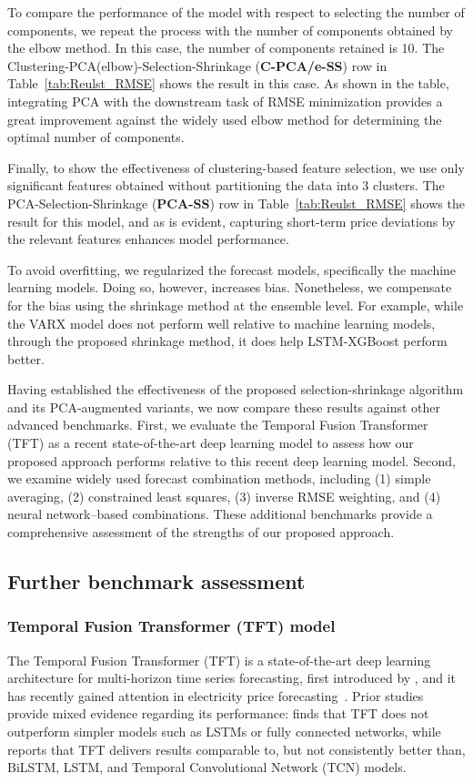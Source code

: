 \documentclass{article}
\begin{document}
To compare the performance of the model with respect to selecting the number of components, we repeat the process with the number of components obtained by the elbow method. In this case, the number of components retained is 10. The Clustering-PCA(elbow)-Selection-Shrinkage (\textbf{C-PCA/e-SS}) row in Table~\ref{tab:Reulst_RMSE} shows the result in this case. As shown in the table, integrating PCA with the downstream task of RMSE minimization provides a great improvement against the widely used elbow method for determining the optimal number of components. 

Finally, to show the effectiveness of clustering-based feature selection, we use only significant features obtained without partitioning the data into 3 clusters. The PCA-Selection-Shrinkage (\textbf{PCA-SS}) row in Table~\ref{tab:Reulst_RMSE} shows the result for this model, and as is evident, capturing short-term price deviations by the relevant features enhances model performance. 

To avoid overfitting, we regularized the forecast models, specifically the machine learning models. Doing so, however, increases bias. Nonetheless, we compensate for the bias using the shrinkage method at the ensemble level. For example, while the VARX model does not perform well relative to machine learning models, through the proposed shrinkage method, it does help LSTM-XGBoost perform better. 

Having established the effectiveness of the proposed selection-shrinkage algorithm and its PCA-augmented variants, we now compare these results against other advanced benchmarks. First, we evaluate the Temporal Fusion Transformer (TFT) as a recent state-of-the-art deep learning model to assess how our proposed approach performs relative to this recent deep learning model. Second, we examine widely used forecast combination methods, including (1) simple averaging, (2) constrained least squares, (3) inverse RMSE weighting, and (4) neural network–based combinations. These additional benchmarks provide a comprehensive assessment of the strengths of our proposed approach. 



\subsection{Further benchmark assessment}
\subsubsection{Temporal Fusion Transformer (TFT) model}
The Temporal Fusion Transformer (TFT) is a state-of-the-art deep learning architecture for multi-horizon time series forecasting, first introduced by \cite{lim2021temporal}, and it has recently gained attention in electricity price forecasting~\cite{jiang2024probabilistic, khan2024transformer, putz2024feasibility}. Prior studies provide mixed evidence regarding its performance: \cite{ganesh2023forecasting} finds that TFT does not outperform simpler models such as LSTMs or fully connected networks, while \cite{deng2024seasonality} reports that TFT delivers results comparable to, but not consistently better than, BiLSTM, LSTM, and Temporal Convolutional Network (TCN) models.  
\end{document}
